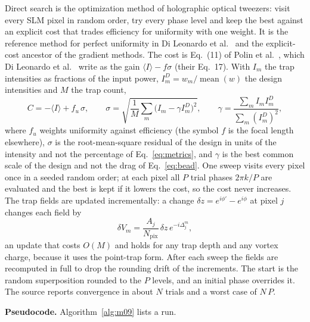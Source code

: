 Direct search is the optimization method of holographic optical tweezers: visit every SLM pixel in random order, try every phase level and keep the best against an explicit cost that trades efficiency for uniformity with one weight. It is the reference method for perfect uniformity in Di Leonardo et al.~\cite{dileonardo} and the explicit-cost ancestor of the gradient methods. The cost is Eq.~(11) of Polin et al.~\cite{polin}, which Di Leonardo et al.~\cite{dileonardo} write as the gain $\langle I\rangle-f\sigma$ (their Eq.~17). With $I_m$ the trap intensities as fractions of the input power, $I^D_m=w_m/\operatorname{mean}(w)$ the design intensities and $M$ the trap count,
\begin{equation}
C=-\langle I\rangle+f_u\,\sigma,\qquad \sigma=\sqrt{\frac1M\sum_m\big(I_m-\gamma I^D_m\big)^2},\qquad
\gamma=\frac{\sum_m I_mI^D_m}{\sum_m(I^D_m)^2},
\label{eq:m09}
\end{equation}
where $f_u$ weights uniformity against efficiency (the symbol $f$ is the focal length elsewhere), $\sigma$ is the root-mean-square residual of the design in units of the intensity and not the percentage of Eq.~\eqref{eq:metrics}, and $\gamma$ is the best common scale of the design and not the drag of Eq.~\eqref{eq:bead}. One sweep visits every pixel once in a seeded random order; at each pixel all $P$ trial phases $2\pi k/P$ are evaluated and the best is kept if it lowers the cost, so the cost never increases. The trap fields are updated incrementally: a change $\delta z=e^{i\phi'}-e^{i\phi}$ at pixel $j$ changes each field by
\begin{equation}
\delta V_m=\frac{A_j}{N_{\mathrm{pix}}}\,\delta z\,e^{-i\Delta_j^m},
\label{eq:m09-update}
\end{equation}
an update that costs $O(M)$ and holds for any trap depth and any vortex charge, because it uses the point-trap form. After each sweep the fields are recomputed in full to drop the rounding drift of the increments. The start is the random superposition rounded to the $P$ levels, and an initial phase overrides it. The source reports convergence in about $N$ trials and a worst case of $N\,P$.

\textbf{Pseudocode.} Algorithm~\ref{alg:m09} lists a run.

